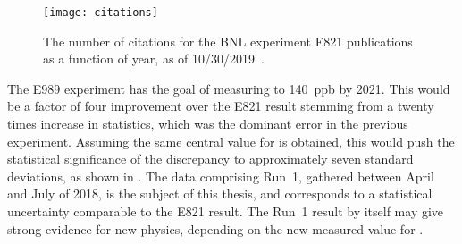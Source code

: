 \begin{figure}
	\centering
	\texttt{[image: citations]}
	\caption[Citations for E821 publications vs year]{The number of citations for the BNL experiment E821 publications as a function of year, as of 10/30/2019~\cite{MarkComm}.}
	\label{fig:E821Citations}
\end{figure}


The E989 experiment has the goal of measuring \amu to \SI{140}{ppb} by 2021. This would be a factor of four improvement over the E821 result stemming from a twenty times increase in statistics, which was the dominant error in the previous experiment. Assuming the same central value for \amu is obtained, this would push the statistical significance of the discrepancy to approximately seven standard deviations, as shown in . The data comprising Run~1, gathered between April and July of 2018, is the subject of this thesis, and corresponds to a statistical uncertainty comparable to the E821 result. The Run~1 result by itself may give strong evidence for new physics, depending on the new measured value for \amu.










